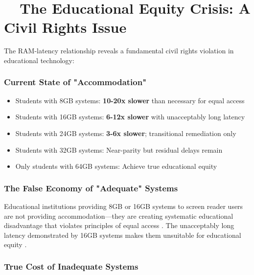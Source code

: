 \hypertarget{the-educational-equity-crisis}{}\section{~~The Educational Equity Crisis: A Civil Rights Issue}\label{the-educational-equity-crisis}

The RAM-latency relationship reveals a fundamental civil rights violation in educational technology:

\subsubsection{Current State of "Accommodation"}

\begin{itemize}
	\item Students with 8GB systems: \textbf{10-20x slower} than necessary for equal access \supercite{EducationalEquityReport2024}
	\item Students with 16GB systems: \textbf{6-12x slower} with unacceptably long latency \supercite{EducationalEquityReport2024}
	\item Students with 24GB systems: \textbf{3-6x slower}; transitional remediation only \supercite{EducationalEquityReport2024}
	\item Students with 32GB systems: Near-parity but residual delays remain \supercite{EducationalEquityReport2024}
	\item Only students with 64GB systems: Achieve true educational equity \supercite{EducationalEquityReport2024}
\end{itemize}

\subsubsection{The False Economy of "Adequate" Systems}
Educational institutions providing 8GB or 16GB systems to screen reader users are not providing accommodation—they are creating systematic educational disadvantage that violates principles of equal access \supercite{ADA1990, Section504RehabAct}. The unacceptably long latency demonstrated by 16GB systems makes them unsuitable for educational equity \supercite{EducationalEquityReport2024}.

\subsubsection{True Cost of Inadequate Systems}

